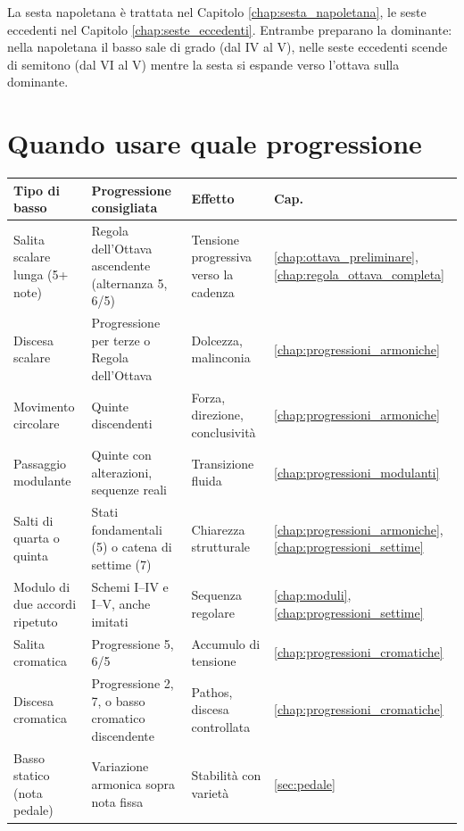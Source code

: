 La sesta napoletana è trattata nel Capitolo \ref{chap:sesta_napoletana}, le seste eccedenti nel Capitolo \ref{chap:seste_eccedenti}. Entrambe preparano la dominante: nella napoletana il basso sale di grado (dal IV al V), nelle seste eccedenti scende di semitono (dal VI al V) mentre la sesta si espande verso l'ottava sulla dominante.

\needspace{0.6\textheight}
\section{Quando usare quale progressione}
\label{sec:sintesi_progressioni}

\begin{regola}
	\label{reg:scelta_progressioni}

	\begin{tabular}{p{3.6cm}p{4.2cm}p{2.8cm}p{1.6cm}}
		\toprule
		\textbf{Tipo di basso} & \textbf{Progressione consigliata} & \textbf{Effetto} & \textbf{Cap.} \\
		\midrule
		Salita scalare lunga (5+ note) & Regola dell'Ottava ascendente (alternanza 5, 6/5) & Tensione progressiva verso la cadenza & \ref{chap:ottava_preliminare}, \ref{chap:regola_ottava_completa} \\
		\midrule
		Discesa scalare & Progressione per terze o Regola dell'Ottava & Dolcezza, malinconia & \ref{chap:progressioni_armoniche} \\
		\midrule
		Movimento circolare & Quinte discendenti & Forza, direzione, conclusività & \ref{chap:progressioni_armoniche} \\
		\midrule
		Passaggio modulante & Quinte con alterazioni, sequenze reali & Transizione fluida & \ref{chap:progressioni_modulanti} \\
		\midrule
		Salti di quarta o quinta & Stati fondamentali (5) o catena di settime (7) & Chiarezza strutturale & \ref{chap:progressioni_armoniche}, \ref{chap:progressioni_settime} \\
		\midrule
		Modulo di due accordi ripetuto & Schemi I--IV e I--V, anche imitati & Sequenza regolare & \ref{chap:moduli}, \ref{chap:progressioni_settime} \\
		\midrule
		Salita cromatica & Progressione 5, 6/5 & Accumulo di tensione & \ref{chap:progressioni_cromatiche} \\
		\midrule
		Discesa cromatica & Progressione 2, 7, o basso cromatico discendente & Pathos, discesa controllata & \ref{chap:progressioni_cromatiche} \\
		\midrule
		Basso statico (nota pedale) & Variazione armonica sopra nota fissa & Stabilità con varietà & \ref{sec:pedale} \\
		\bottomrule
	\end{tabular}
\end{regola}
